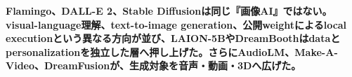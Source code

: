 \noindent\textbf{Flamingo、DALL-E 2、Stable Diffusionは同じ『画像AI』ではない。visual-language理解、text-to-image generation、公開weightによるlocal executionという異なる方向が並び、LAION-5BやDreamBoothはdataとpersonalizationを独立した層へ押し上げた。さらにAudioLM、Make-A-Video、DreamFusionが、生成対象を音声・動画・3Dへ広げた。}\autocite{src-13aed13ff36c,src-16a1a1dc486e,src-26aadbc0393f,src-27297a80fac0,src-2832ee43ab8f,src-2c38d2f354fa,src-86ce6205a4ed,src-929080260e16,src-c5c7eddb6cf6,src-e0a494dc6724}
